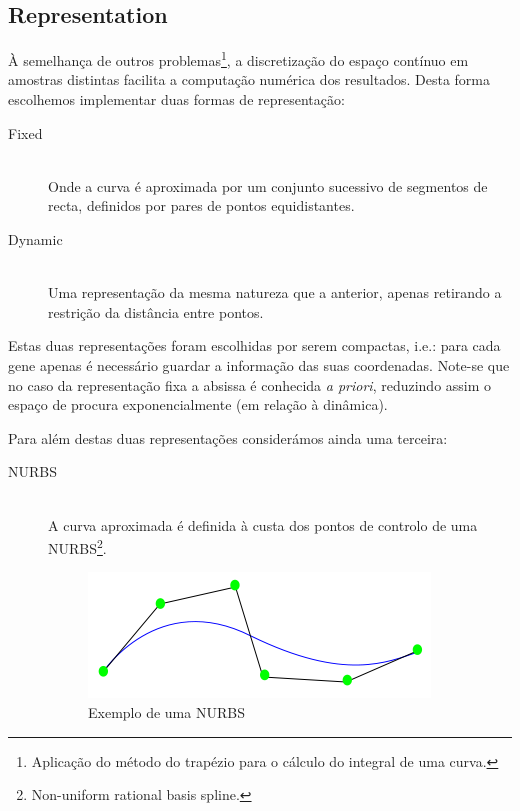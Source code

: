 \documentclass[a4paper]{article}
\begin{document}
\subsection{Representation}
\label{subsec:representation}
\indent \indent À semelhança de outros problemas\footnote[1]{Aplicação do método do trapézio para o cálculo do integral de uma curva.}, a discretização do espaço contínuo em amostras
distintas facilita a computação numérica dos resultados. Desta forma escolhemos implementar duas formas de representação:

\begin{description}
	\item[Fixed] \hfill \\
	\label{it:fixed_representation}
		Onde a curva é aproximada por um conjunto sucessivo de segmentos de recta, definidos por pares de pontos equidistantes.
	\item[Dynamic] \hfill \\
	\label{it:dynamic_representation}
		Uma representação da mesma natureza que a anterior, apenas retirando a restrição da distância entre pontos.
\end{description}

\indent Estas duas representações foram escolhidas por serem compactas, i.e.: para cada gene apenas é necessário guardar a informação das suas coordenadas.
Note-se que no caso da representação fixa a absissa é conhecida \emph{a priori}, reduzindo assim o espaço de procura exponencialmente (em relação à dinâmica).

\indent Para além destas duas representações considerámos ainda uma terceira:

\begin{description}
	\item[NURBS] \hfill \\ 
		A curva aproximada é definida à custa dos pontos de controlo de uma NURBS\footnote[2]{Non-uniform rational basis spline.}. 
		\begin{figure}[ht]
			\centering
			\includegraphics[scale=0.50]{images/NURBstatic.png}
			\caption{Exemplo de uma NURBS}
			\label{fig:nurbs}
		\end{figure}
\end{description}
\end{document}
